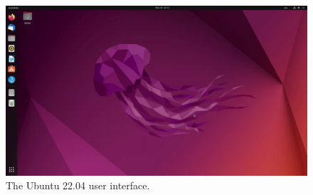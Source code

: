 \begin{frame}
  \begin{figure}
    \includegraphics[width=\columnwidth]{fig/ubuntu.png}
    \caption{The Ubuntu 22.04 user interface.}
  \end{figure}
\end{frame}


